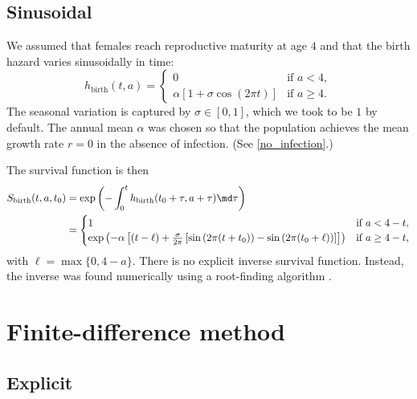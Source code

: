 \documentclass{jpmarticle}
\begin{document}
\subsection{Sinusoidal}

We assumed that females reach reproductive maturity at age $4$ and
that the birth hazard varies sinusoidally in time:
\begin{equation}
  h_{\text{birth}}(t, a) =
  \begin{cases}
    0 & \text{if $a < 4$},
    \\
    \alpha \left[1
      + \sigma \cos\left(2 \pi t\right)\right]
    & \text{if $a \geq 4$}.
  \end{cases}
\end{equation}
The seasonal variation is captured by $\sigma \in [0, 1]$, which we
took to be $1$ by default.  The annual mean $\alpha$ was chosen so
that the population achieves the mean growth rate $r = 0$ in the
absence of infection.  (See \autoref{no_infection}.)

The survival function is then
\begin{equation}
  \begin{split}
    S_{\text{birth}}(t, a, t_0) &=
    \exp\left(- \int_0^t h_{\text{birth}}(t_0 + \tau, a + \tau) \md
      \tau\right)
    \\
    &=
    \begin{cases}
      1 & \text{if $a < 4 - t$},
      \\
      \exp\left(- \alpha \left[
          (t - \ell)
          + \frac{\sigma}{2 \pi}
          \left[\sin\left(2 \pi (t + t_0)\right)
            - \sin\left(2 \pi (t_0 + \ell)\right)\right]
        \right]
      \right)
      & \text{if $a \geq 4 - t$},
    \end{cases}
  \end{split}
\end{equation}
with $\ell = \max\{0, 4 - a\}$.  There is no explicit inverse survival
function.  Instead, the inverse was found numerically using a
root-finding algorithm \citep{scipy}.



\section{Finite-difference method}

\subsection{Explicit}
\end{document}

